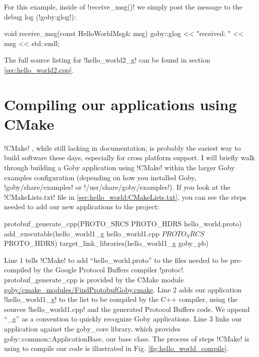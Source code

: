For this example, inside of !receive_msg()! we simply post the message to the debug log (!goby:glog!):

\begin{boxedverbatim}
void receive_msg(const HelloWorldMsg& msg)
{
   goby::glog << "received: " << msg << std::endl;
}
\end{boxedverbatim}
\resetbvlinenumber

The full source listing for !hello_world2_g! can be found in section \ref{sec:hello_world2.cpp}.

\section{Compiling our applications using CMake}

!CMake! \cite{cmake}, while still lacking in documentation, is probably the easiest way to build software these days, especially for cross platform support. I will briefly walk through building a Goby application using !CMake! within the larger Goby examples configuration (depending on how you installed Goby, !goby/share/examples! or !/usr/share/goby/examples!). If you look at the !CMakeLists.txt! file in \ref{sec:hello_world:CMakeLists.txt}, you can see the steps needed to add our new applications to the project:

\begin{boxedverbatim}
protobuf_generate_cpp(PROTO_SRCS PROTO_HDRS hello_world.proto)
add_executable(hello_world1_g hello_world1.cpp ${PROTO_SRCS} ${PROTO_HDRS})
target_link_libraries(hello_world1_g goby_pb)
\end{boxedverbatim}
\resetbvlinenumber

Line 1 tells !CMake! to add ``hello\_world.proto'' to the files needed to be pre-compiled by the Google Protocol Buffers compiler !protoc!. protobuf\_generate\_cpp is provided by the CMake module \href{http://bazaar.launchpad.net/~goby-dev/goby/trunk/annotate/head:/cmake_modules/FindProtobufGoby.cmake}{goby/cmake\_modules/FindProtobufGoby.cmake}. Line 2 adds our application !hello_world1_g! to the list to be compiled by the C++ compiler, using the sources !hello_world1.cpp! and the generated Protocol Buffers code. We append ``\_g'' as a convention to quickly recognize Goby applications. Line 3 links our application against the goby\_core library, which provides goby::common::ApplicationBase, our base class. The process of steps !CMake! is using to compile our code is illustrated in Fig. \ref{fig:hello_world_compile}.

